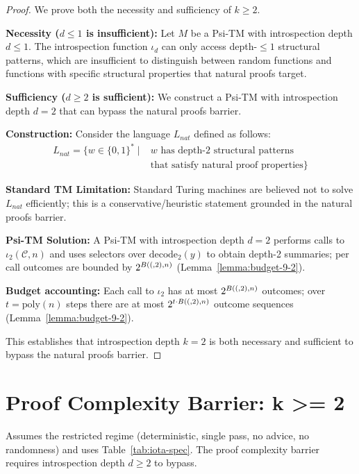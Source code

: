 \begin{proof}
We prove both the necessity and sufficiency of $k \geq 2$.

\textbf{Necessity ($d \le 1$ is insufficient):}
Let $M$ be a Psi-TM with introspection depth $d \leq 1$. The introspection function $\iota_d$ can only access depth-$\leq 1$ structural patterns, which are insufficient to distinguish between random functions and functions with specific structural properties that natural proofs target.

\textbf{Sufficiency ($d \ge 2$ is sufficient):}
We construct a Psi-TM with introspection depth $d = 2$ that can bypass the natural proofs barrier.

\textbf{Construction:}
Consider the language $L_{nat}$ defined as follows:
\begin{align}
L_{nat} = \{w \in \{0,1\}^* \mid &\text{$w$ has depth-2 structural patterns} \nonumber \\
&\text{that satisfy natural proof properties}\}
\end{align}

\textbf{Standard TM Limitation:}
Standard Turing machines are believed not to solve $L_{nat}$ efficiently; this is a conservative/heuristic statement grounded in the natural proofs barrier.

\textbf{Psi-TM Solution:}
A Psi-TM with introspection depth $d = 2$ performs calls to $\iota_2(\mathcal{C},n)$ and uses selectors over $\mathrm{decode}_2(y)$ to obtain depth-2 summaries; per call outcomes are bounded by $2^{B((,2),n)}$ (Lemma~\ref{lemma:budget-9-2}).

\textbf{Budget accounting:}
Each call to $\iota_2$ has at most $2^{B((,2),n)}$ outcomes; over $t=\mathrm{poly}(n)$ steps there are at most $2^{t\cdot B((,2),n)}$ outcome sequences (Lemma~\ref{lemma:budget-9-2}).

This establishes that introspection depth $k = 2$ is both necessary and sufficient to bypass the natural proofs barrier.
\end{proof}

\section{Proof Complexity Barrier: k >= 2}

\begin{theorem}
Assumes the restricted regime (deterministic, single pass, no advice, no randomness) and uses Table~\ref{tab:iota-spec}.
The proof complexity barrier requires introspection depth $d \geq 2$ to bypass.
\end{theorem}

